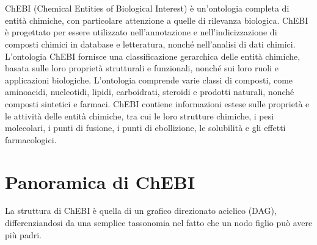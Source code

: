 \documentclass[12pt,a4paper,openright,twoside]{book}
\begin{document}
\frontmatter



\tableofcontents

\mainmatter

\chapter{\introductionname}
\label{chap:introduction}

ChEBI (Chemical Entities of Biological Interest) è un'ontologia completa di entità chimiche, con particolare attenzione a quelle di rilevanza biologica. ChEBI è progettato per essere utilizzato nell'annotazione e nell'indicizzazione di composti chimici in database e letteratura, nonché nell'analisi di dati chimici.
L'ontologia ChEBI fornisce una classificazione gerarchica delle entità chimiche, basata sulle loro proprietà strutturali e funzionali, nonché sui loro ruoli e applicazioni biologiche. L'ontologia comprende varie classi di composti, come aminoacidi, nucleotidi, lipidi, carboidrati, steroidi e prodotti naturali, nonché composti sintetici e farmaci.
ChEBI contiene informazioni estese sulle proprietà e le attività delle entità chimiche, tra cui le loro strutture chimiche, i pesi molecolari, i punti di fusione, i punti di ebollizione, le solubilità e gli effetti farmacologici.

\chapter{Panoramica di ChEBI} %
\label{chap:panoramica}
La struttura di ChEBI è quella di un grafico direzionato aciclico (DAG),
differenziandosi da una semplice tassonomia nel fatto che un nodo figlio può avere più padri.
\end{document}
